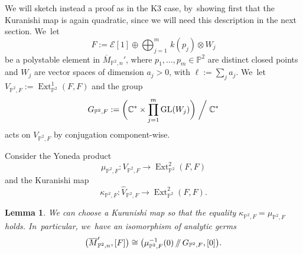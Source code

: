 \documentclass[JEP,XML,SOM,Unicode,published]{cedram}
\providecommand\sslash{\mathop{/\mkern-5.5mu/}}
\newcommand{\CC}{{\mathbb C}}\let\C\CC
\newcommand{\PP}{{\mathbb P}}\let\P\PP
\newcommand\cE{\mathcal{E}}
\DeclareMathOperator{\Ext}{Ext}
\DeclareMathOperator{\GL}{GL}
\newtheorem{lemm}{Lemma}[section]
\theoremstyle{definition}
\begin{document}
We will sketch instead a proof as in the K3 case, by~showing first that the Kuranishi map is again quadratic, since we will need this description in the next section. We~let
\[
F:=\cE[1]\oplus \bigoplus_{j=1}^m\, k(p_j)\otimes W_j
\]
be a polystable element in $\overline{M}_{\PP^2,n}'$, where $p_1,\dots,p_m\in \PP^2$ are distinct closed points and $W_j$ are vector spaces of dimension $a_j>0$, with $\ell:=\sum_j a_j$. We~let $V_{\PP^2,F}:=\Ext^1_{\PP^2}(F,F)$ and the group
\begin{equation}\label{eq:groupP^2}
G_{\PP^2,F}:=\biggl(\CC^*\times \prod_{j=1}^m\GL(W_j)\biggr)\biggm/\CC^*
\end{equation}
acts on $V_{\PP^2,F}$ by conjugation component-wise.

Consider the Yoneda product
\[
\mu_{\PP^2,F}\colon V_{\PP^2,F} \to \Ext^2_{\PP^2}(F,F)
\]
and the Kuranishi map
\[
\kappa_{\PP^2,F}\colon \widehat{V}_{\PP^2,F} \to \Ext^2_{\PP^2}(F,F).
\]

\begin{lemm}\label{lem:KuranishiP2}
We can choose a Kuranishi map so that the equality $\kappa_{\PP^2,F}=\mu_{\PP^2,F}$ holds. In~particular, we~have an isomorphism of analytic germs
\[
\bigl(\overline{M}_{\PP^2,n}',[F]\bigr)\cong \bigl(\mu_{\PP^2,F}^{-1}(0)\sslash G_{\PP^2,F},[0]\bigr).
\]
\end{lemm}
\end{document}
